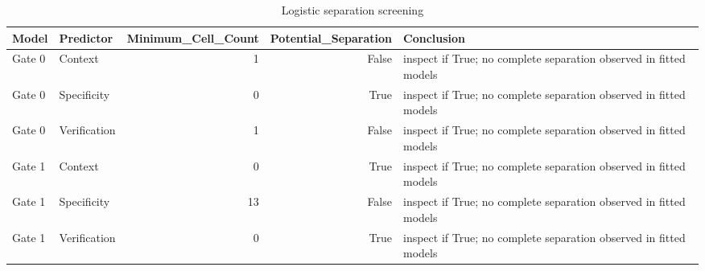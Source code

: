 \begin{table}
\caption{Logistic separation screening}
\label{tab:separation}
\begin{tabular}{llrrl}
\toprule
Model & Predictor & Minimum_Cell_Count & Potential_Separation & Conclusion \\
\midrule
Gate 0 & Context & 1 & False & inspect if True; no complete separation observed in fitted models \\
Gate 0 & Specificity & 0 & True & inspect if True; no complete separation observed in fitted models \\
Gate 0 & Verification & 1 & False & inspect if True; no complete separation observed in fitted models \\
Gate 1 & Context & 0 & True & inspect if True; no complete separation observed in fitted models \\
Gate 1 & Specificity & 13 & False & inspect if True; no complete separation observed in fitted models \\
Gate 1 & Verification & 0 & True & inspect if True; no complete separation observed in fitted models \\
\bottomrule
\end{tabular}
\end{table}
